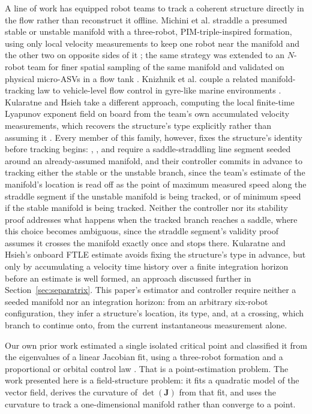 \documentclass[lettersize,journal]{IEEEtran}
\begin{document}
A line of work has equipped robot teams to track a coherent structure directly
in the flow rather than reconstruct it offline. Michini et al. straddle a
presumed stable or unstable manifold with a three-robot, PIM-triple-inspired
formation, using only local velocity measurements to keep one robot near the
manifold and the other two on opposite sides of it \cite{9}; the same strategy was
extended to an $N$-robot team for finer spatial sampling of the same manifold
\cite{10} and validated on physical micro-ASVs in a flow tank \cite{11}. Knizhnik et al.
couple a related manifold-tracking law to vehicle-level flow control in
gyre-like marine environments \cite{12}. Kularatne and Hsieh take a different
approach, computing the local finite-time Lyapunov exponent field on board
from the team's own accumulated velocity measurements, which recovers the
structure's type explicitly rather than assuming it \cite{13}. Every member of this
family, however, fixes the structure's identity before tracking begins: \cite{9},
\cite{10}, and \cite{11} require a saddle-straddling line segment seeded around an
already-assumed manifold, and their controller commits in advance to
tracking either the stable or the unstable branch, since the team's estimate
of the manifold's location is read off as the point of maximum measured speed
along the straddle segment if the unstable manifold is being tracked, or of
minimum speed if the stable manifold is being tracked. Neither the controller
nor its stability proof addresses what happens when the tracked branch
reaches a saddle, where this choice becomes ambiguous, since the straddle
segment's validity proof assumes it crosses the manifold exactly once and
stops there. Kularatne and Hsieh's onboard FTLE estimate avoids fixing the
structure's type in advance, but only by accumulating a velocity time history
over a finite integration horizon before an estimate is well formed, an
approach discussed further in Section~\ref{sec:separatrix}. This paper's
estimator and controller require neither a seeded manifold nor an
integration horizon: from an arbitrary six-robot configuration, they infer a
structure's location, its type, and, at a crossing, which branch to continue
onto, from the current instantaneous measurement alone.

Our own prior work estimated a single isolated critical point and classified
it from the eigenvalues of a linear Jacobian fit, using a three-robot
formation and a proportional or orbital control law \cite{14}. That is a
point-estimation problem. The work presented here is a field-structure
problem: it fits a quadratic model of the vector field, derives the
curvature of $\det(\mathbf{J})$ from that fit, and uses the curvature to
track a one-dimensional manifold rather than converge to a point.
\end{document}
